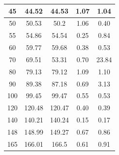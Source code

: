 \documentclass[10pt, conference, compsocconf]{IEEEtran}
\begin{document}
\begin{table}[!t]
\begin{tabular}{|c|c|c|c|c|}
45 & 44.52 & 44.53 & 1.07 & 1.04 \\ \hline
50 & 50.53 & 50.2 & 1.06 & 0.40 \\ \hline
55 & 54.86 & 54.54 & 0.25 & 0.84 \\ \hline
60 & 59.77 & 59.68 & 0.38 & 0.53 \\ \hline
70 & 69.51 & 53.31 & 0.70 & 23.84 \\ \hline
80 & 79.13 & 79.12 & 1.09 & 1.10 \\ \hline
90 & 89.38 & 87.18 & 0.69 & 3.13 \\ \hline
100 & 99.45 & 99.47 & 0.55 & 0.53 \\ \hline
120 & 120.48 & 120.47 & 0.40 & 0.39 \\ \hline
140 & 140.21 & 140.24 & 0.15 & 0.17 \\ \hline
148 & 148.99 & 149.27 & 0.67 & 0.86 \\ \hline
165 & 166.01 & 166.5 & 0.61 & 0.91 \\ \hline
\end{tabular}
\end{table}
\end{document}
